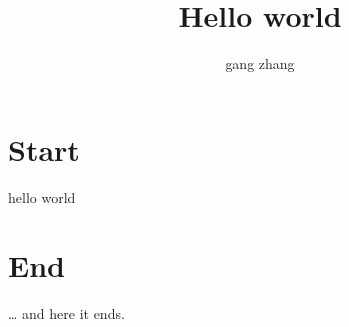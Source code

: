 \documentclass[a4paper,11pt]{article}
\author{gang zhang}
\title{Hello world}
\begin{document}
\maketitle

\tableofcontents
\section{Start}
hello world
\section{End}

\ldots{} and here it ends.
\end{document}
